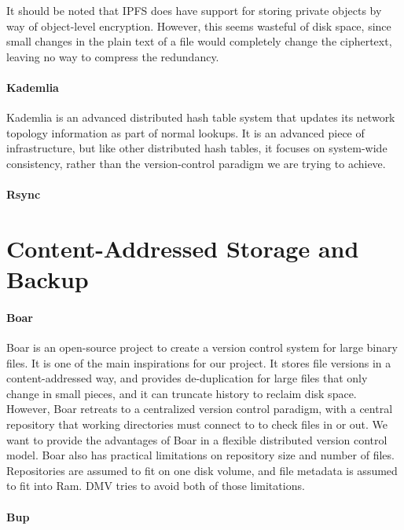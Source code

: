 It should be noted that IPFS does have support for storing private objects by
way of object-level encryption. However, this seems wasteful of disk space,
since small changes in the plain text of a file would completely change the
ciphertext, leaving no way to compress the redundancy.


\paragraph{Kademlia}

Kademlia \cite{Maymounkov2002} is an advanced distributed hash table system that
updates its network topology information as part of normal lookups. It is an
advanced piece of infrastructure, but like other distributed hash tables, it
focuses on system-wide consistency, rather than the version-control paradigm we
are trying to achieve.



\paragraph{Rsync}



\section{Content-Addressed Storage and Backup}

\paragraph{Boar}

Boar \cite{boar_homepage} is an open-source project to create a version control
system for large binary files. It is one of the main inspirations for our
project. It stores file versions in a content-addressed way, and provides
de-duplication for large files that only change in small pieces, and it can
truncate history to reclaim disk space. However, Boar retreats to a centralized
version control paradigm, with a central repository that working directories
must connect to to check files in or out. We want to provide the advantages of
Boar in a flexible distributed version control model. Boar also has practical
limitations on repository size and number of files. Repositories are assumed to
fit on one disk volume, and file metadata is assumed to fit into Ram. DMV tries
to avoid both of those limitations.


\paragraph{Bup}\label{related_bup}

